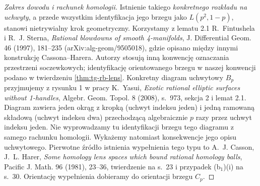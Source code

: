 \begin{proof}[Zakres dowodu i rachunek homologii]
Istnienie takiego \emph{konkretnego rozkładu na uchwyty},
a przede wszystkim identyfikacja jego brzegu jako
$L(p^2,1-p)$, stanowi nietrywialny krok geometryczny.
Korzystamy z lematu 2.1 R.~Fintushela i R.~J. Sterna,
\emph{Rational blowdowns of smooth 4-manifolds},
J. Differential Geom. 46 (1997), 181--235
(arXiv:alg-geom/9505018), gdzie opisano między
innymi konstrukcję Cassona--Harera. Autorzy stosują
inną konwencję oznaczania przestrzeni soczewkowych;
identyfikację orientowanego brzegu w naszej konwencji
podano w twierdzeniu \ref{thm:tg-rb-lens}.
Konkretny diagram uchwytowy $B_p$ przyjmujemy
z rysunku 1 w pracy K.~Yasui,
\emph{Exotic rational elliptic surfaces without
1-handles}, Algebr. Geom. Topol. 8 (2008),
s.~973, sekcja 2 i lemat 2.1. Diagram zawiera
jeden okrąg z kropką (uchwyt indeksu jeden)
i jedną ramowaną składową (uchwyt indeksu dwa)
przechodzącą algebraicznie $p$ razy przez
uchwyt indeksu jeden. Nie wyprowadzamy tu
identyfikacji brzegu tego diagramu z samego
rachunku homologii. Wykażemy natomiast
konsekwencje jego opisu uchwytowego.
Pierwotne źródło istnienia wypełnienia tego typu
to A.~J. Casson, J.~L. Harer,
\emph{Some homology lens spaces which bound
rational homology balls}, Pacific J. Math. 96
(1981), 23--36, twierdzenie na s.~23
i przypadek (b$_1$)(i) na s.~30.
Orientację wypełnienia dobieramy do orientacji
brzegu $C_p$.


\end{proof}

